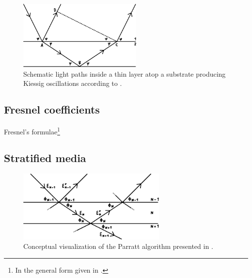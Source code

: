 \cite{Kiessig_1931}

\begin{figure}[H]
	\centering
	\includegraphics[width=0.55\textwidth]{content/graphics/kiessig.pdf}
	\caption{Schematic light paths inside a thin layer atop a substrate producing Kiessig oscillations according to \cite{Kiessig_1931}.}
	\label{fig:kiessig}
\end{figure}



\subsection{Fresnel coefficients}

Fresnel's formulae\footnote{In the general form given in \cite{Parratt_1954}.}



\subsection{Stratified media}

\cite{Parratt_1954}

\begin{figure}[H]
	\centering
	\includegraphics[width=0.66\textwidth]{content/graphics/parratt.pdf}
	\caption{Conceptual visualization of the Parratt algorithm presented in \cite{Parratt_1954}.}
	\label{fig:parratt}
\end{figure}

\cite{xray}
